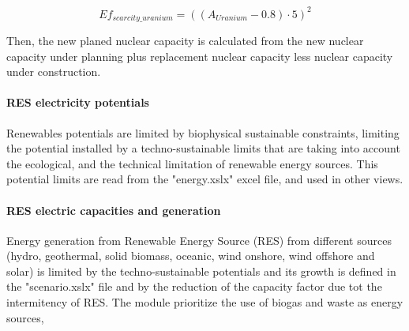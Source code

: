 \begin{equation}
Ef_{scarcity\_uranium}=  ((A_{Uranium}-0.8) \cdot 5)^2
\end{equation}

Then, the new planed nuclear capacity is calculated from the new nuclear capacity under planning plus replacement nuclear capacity less nuclear capacity under construction.


\paragraph{RES electricity potentials}

Renewables potentials are limited by biophysical sustainable constraints, limiting the potential installed by a techno-sustainable limits that are taking into account the ecological, and the technical limitation of renewable energy sources. This potential limits are read from the "energy.xslx" excel file, and used in other views.

\paragraph{RES electric capacities and generation}

Energy generation from Renewable Energy Source (RES) from different sources (hydro, geothermal, solid biomass, oceanic, wind onshore, wind offshore and solar) is limited by the techno-sustainable potentials and its growth is defined in the "scenario.xslx" file and by the reduction of the capacity factor due tot the intermitency of RES. The module prioritize the use of biogas and waste as energy sources,